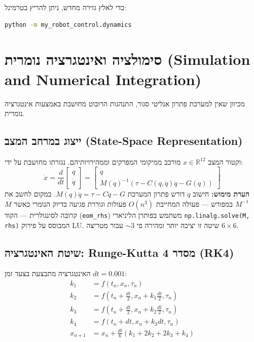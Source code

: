 \documentclass[11pt,a4paper]{article}
\begin{document}
כדי לאלץ גזירה מחדש, ניתן להריץ בטרמינל:
\begin{english}
\begin{lstlisting}[language=bash]
python -m my_robot_control.dynamics
\end{lstlisting}
\end{english}


\section{סימולציה ואינטגרציה נומרית (\textenglish{Simulation and Numerical Integration})}
מכיוון שאין למערכת פתרון אנליטי סגור, התנהגות הרובוט מחושבת באמצעות אינטגרציה נומרית.

\subsection{ייצוג במרחב המצב (\textenglish{State-Space Representation})}
וקטור המצב $x \in \mathbb{R}^{12}$ מורכב ממיקומי המפרקים וממהירויותיהם. נגזרתו מחושבת על ידי:
\begin{equation}
\dot{x} = \frac{d}{dt} \begin{bmatrix} q \\ \dot{q} \end{bmatrix} = \begin{bmatrix} \dot{q} \\ M(q)^{-1} \left( \tau - C(q, \dot{q})\dot{q} - G(q) \right) \end{bmatrix}
\end{equation}
\textbf{הערת מימוש:} חישוב $\ddot{q}$ דורש פתרון המערכת $M(q)\ddot{q} = \tau - C\dot{q} - G$. במקום לחשב את $M^{-1}$ במפורש — פעולה המחייבת $O(n^3)$ פעולות וגוררת פגיעה בדיוק הנומרי כאשר $M$ קרובה לסינגולרית — הקוד (\texttt{eom\_rhs}) משתמש בפותרן הליניארי \texttt{np.linalg.solve(M, rhs)} המבוסס על פירוק LU. שיטה זו יציבה יותר ומהירה פי $\sim3$ עבור מטריצה $6\times6$.

\subsection{שיטת האינטגרציה: \textenglish{Runge-Kutta} מסדר 4 (\textenglish{RK4})}
האינטגרציה מתבצעת בצעד זמן $dt = 0.001$:
\begin{align}
k_1 &= f(t_n, x_n, \tau_n) \nonumber \\
k_2 &= f\left(t_n + \frac{dt}{2}, x_n + k_1 \frac{dt}{2}, \tau_n\right) \nonumber \\
k_3 &= f\left(t_n + \frac{dt}{2}, x_n + k_2 \frac{dt}{2}, \tau_n\right) \nonumber \\
k_4 &= f(t_n + dt, x_n + k_3 dt, \tau_n) \nonumber \\
x_{n+1} &= x_n + \frac{dt}{6}(k_1 + 2k_2 + 2k_3 + k_4)
\end{align}
\end{document}
